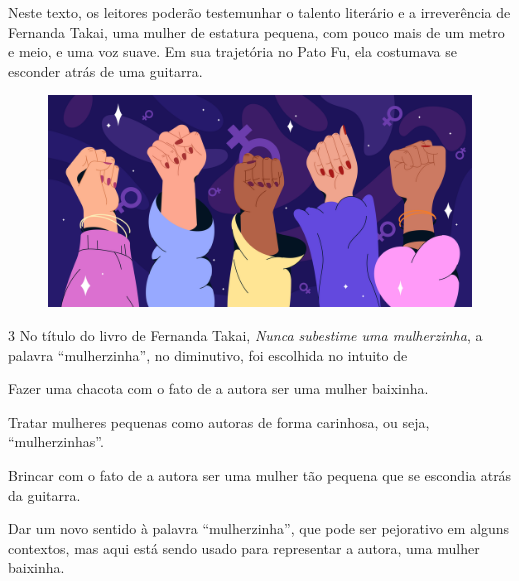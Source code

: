 \begin{myquote}
Neste texto, os leitores poderão testemunhar o talento literário e a
irreverência de Fernanda Takai, uma mulher de estatura pequena, com
pouco mais de um metro e meio, e uma voz suave. Em sua trajetória no
Pato Fu, ela costumava se esconder atrás de uma guitarra.
\begin{figure}[H]
\centering\includegraphics[width=\textwidth]{./imgSAEB_6_POR/freepik/PORT_6_IMG-7.jpeg}
\end{figure}

\end{myquote}


\num{3} No título do livro de Fernanda Takai, \emph{Nunca subestime uma
mulherzinha}, a palavra ``mulherzinha'', no diminutivo, foi escolhida no
intuito de

\begin{escolha}
\item Fazer uma chacota com o fato de a autora ser uma mulher baixinha.
\item Tratar mulheres pequenas como autoras de forma carinhosa, ou seja,
``mulherzinhas''.
\item Brincar com o fato de a autora ser uma mulher tão pequena que se
escondia atrás da guitarra.
\item Dar um novo sentido à palavra ``mulherzinha'', que pode ser
pejorativo em alguns contextos, mas aqui está sendo usado para
representar a autora, uma mulher baixinha.
\end{escolha}


